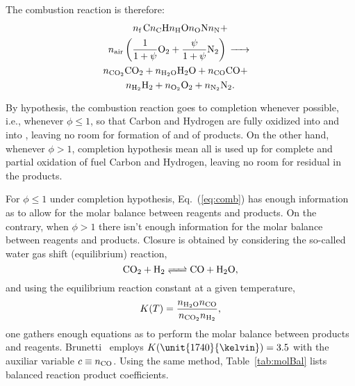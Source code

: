     The combustion reaction is therefore:%
    \begin{multline}
        \NF\,\mbox{\ce{C\NC H\NH O\NO N\NN}} +\\
        \NA\left(
            \frac{1}{1+\psi}\mbox{\ce{O2}} +
            \frac{\psi}{1+\psi}\mbox{\ce{N2}}
        \right) \ce{->} \\ \shoveright
        {\NCOO\mbox{\ce{CO2}} +
        \NHHO\mbox{\ce{H2O}} +
        \NCO\mbox{\ce{CO}} +} \\
        \NHH\mbox{\ce{H2}} +
        \NOO\mbox{\ce{O2}} +
        \NNN\mbox{\ce{N2}}.
        \label{eq:comb}
    \end{multline}

    By hypothesis, the combustion reaction goes to completion whenever possible, i.e., whenever $\phi \leqslant 1$, so that Carbon and Hydrogen  are  fully  oxidized  into    and  into
    , leaving no room for formation of  and of  products. On the other hand, whenever $\phi > 1$, completion hypothesis mean all   is  used  up  for  complete  and
    partial oxidation of fuel Carbon and Hydrogen, leaving no room for residual  in the products.

    For $\phi \leqslant 1$ under completion hypothesis, Eq.~(\ref{eq:comb}) has enough information as to allow for the molar balance between reagents and products. On the contrary, when  $\phi
    > 1$ there isn't enough information for the molar balance between reagents and products. Closure is obtained by considering the so-called water gas shift (equilibrium) reaction,%
    \begin{equation}
        \mbox{\ce{CO2 + H2 <=> CO + H2O}},
        \label{eq:wgsr}
    \end{equation}
    \noindent and using the equilibrium reaction constant at a given temperature,%
    \begin{equation}
        K(T) = \frac{\NHHO\NCO}{\NCOO\NHH},
        \label{eq:K}
    \end{equation}
    \noindent one gathers enough equations as to perform the molar balance between products and reagents. Brunetti~\cite{2012-BrunettiF-Blucher} employs $K(\unit{1740}{\kelvin})  =  3.5$  with
    the auxiliar variable $c\equiv\NCO$. Using the same method, Table~\ref{tab:molBal} lists balanced reaction product coefficients.

